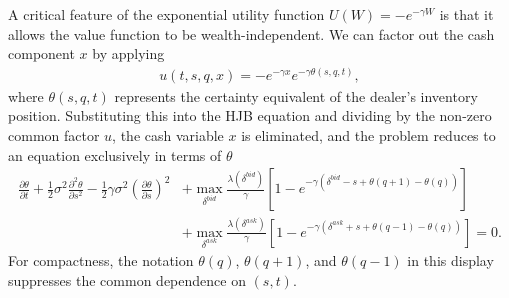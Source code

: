 \documentclass[a4paper,10pt,titlepage,oneside,openany]{book}
\theoremstyle{plain}\newtheorem{theorem}{Theorem}[chapter]
\theoremstyle{definition}\newtheorem{definition}{Definition}[chapter]
\theoremstyle{remark}\newtheorem{remark}{Remark}[chapter]
\begin{document}
A critical feature of the exponential utility function $U(W) = -e^{-\gamma W}$ is that it allows the value function to be wealth-independent. We can factor out the cash component $x$ by applying
\begin{align*}
    u(t,s,q,x) = -e^{-\gamma x}e^{-\gamma \theta(s,q,t)},
\end{align*}
where $\theta(s,q,t)$ represents the certainty equivalent of the dealer's inventory position. Substituting this into the HJB equation and dividing by the non-zero common factor $u$, the cash variable $x$ is eliminated, and the problem reduces to an equation exclusively in terms of $\theta$
\begin{align*}
    \frac{\partial \theta}{\partial t} + \frac{1}{2}\sigma^2 \frac{\partial^2 \theta}{\partial s^2} - \frac{1}{2}\gamma \sigma^2 \left(\frac{\partial \theta}{\partial s}\right)^2 &+ \max_{\delta^{bid}} \frac{\lambda(\delta^{bid})}{\gamma} \left[ 1 - e^{-\gamma (\delta^{bid} - s + \theta(q+1) - \theta(q))} \right] \\
    &+ \max_{\delta^{ask}} \frac{\lambda(\delta^{ask})}{\gamma} \left[ 1 - e^{-\gamma (\delta^{ask} + s + \theta(q-1) - \theta(q))} \right] = 0.
\end{align*}
For compactness, the notation $\theta(q)$, $\theta(q+1)$, and $\theta(q-1)$ in this display suppresses the common dependence on $(s,t)$.
\end{document}
